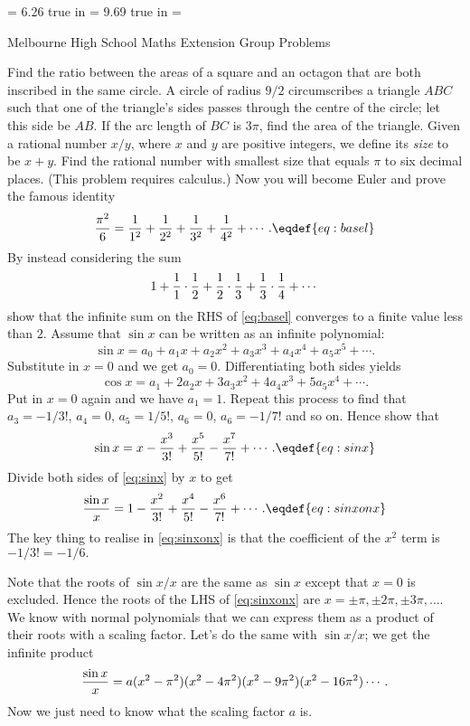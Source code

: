
\magnification{}
\hsize = 6.26 true in
\vsize = 9.69 true in
\footline={}

{\obeylines
\noindent Melbourne High School
\noindent  Maths Extension Group
}
\medskip
\beginsection Problems

\numberedlist
\li Find the ratio between the areas of a square and an octagon that are both inscribed in the same
circle.
\li A circle of radius $9/2$ circumscribes a triangle $ABC$ such that one of the triangle's sides
passes through the centre of the circle; let this side be $AB$. If the arc length of $BC$ is $3\pi$,
find the area of the triangle.
\li Given a rational number $x/y$, where $x$ and $y$ are positive integers, we define its {\it size}
to be $x+y$. Find the rational number with smallest size that equals $\pi$ to six decimal places.
\li (This problem requires calculus.) Now you will become Euler and prove the famous identity
$${\pi^2\over6}={1\over1^2}+{1\over2^2}+{1\over3^2}+{1\over{4^2}}+\cdots.\eqdef{eq:basel}$$
\numberedlist
\li By instead considering the sum
$$1+{1\over1}\cdot{1\over2}+{1\over2}\cdot{1\over3}+{1\over3}\cdot{1\over4}+\cdots$$
show that the infinite sum on the RHS of \eqref{eq:basel} converges to a finite value less than $2$.
\li Assume that $\sin x$ can be written as an infinite polynomial:
$$\sin x=a_0+a_1x+a_2x^2+a_3x^3+a_4x^4+a_5x^5+\cdots.$$
Substitute in $x=0$ and we get $a_0=0$. Differentiating both sides yields
$$\cos x=a_1+2a_2x+3a_3x^2+4a_4x^3+5a_5x^4+\cdots.$$
Put in $x=0$ again and we have $a_1=1$.
Repeat this process to find that $a_3=-1/3!$, $a_4=0$, $a_5=1/5!$, $a_6=0$, $a_6=-1/7!$ and so on.
Hence show that
$$\sin x=x-{x^3\over3!}+{x^5\over5!}-{x^7\over7!}+\cdots.\eqdef{eq:sinx}$$
\li Divide both sides of \eqref{eq:sinx} by $x$ to get
$${\sin x\over x}=1-{x^2\over3!}+{x^4\over5!}-{x^6\over7!}+\cdots.\eqdef{eq:sinxonx}$$
The key thing to realise in \eqref{eq:sinxonx} is that the coefficient of the $x^2$ term is $-1/3!=-1/6.$

Note that the roots of $\sin x/x$ are the same as $\sin x$ except that $x=0$ is excluded. Hence
the roots of the LHS of \eqref{eq:sinxonx} are $x=\pm\pi,\pm2\pi,\pm3\pi,\ldots.$
We know with normal polynomials that we can express them as a product of their roots with a
scaling factor. Let's do the same with $\sin x/x$; we get the infinite product
$${\sin x\over x}=a(x^2-\pi^2)(x^2-4\pi^2)(x^2-9\pi^2)(x^2-16\pi^2)\cdots.$$
Now we just need to know what the scaling factor $a$ is.

